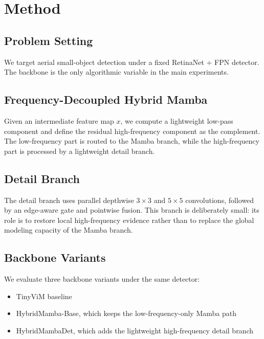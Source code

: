 \section{Method}

\subsection{Problem Setting}

We target aerial small-object detection under a fixed RetinaNet + FPN detector. The backbone is the only algorithmic variable in the main experiments.

\subsection{Frequency-Decoupled Hybrid Mamba}

Given an intermediate feature map $x$, we compute a lightweight low-pass component and define the residual high-frequency component as the complement. The low-frequency part is routed to the Mamba branch, while the high-frequency part is processed by a lightweight detail branch.

\subsection{Detail Branch}

The detail branch uses parallel depthwise $3 \times 3$ and $5 \times 5$ convolutions, followed by an edge-aware gate and pointwise fusion. This branch is deliberately small: its role is to restore local high-frequency evidence rather than to replace the global modeling capacity of the Mamba branch.

\subsection{Backbone Variants}

We evaluate three backbone variants under the same detector:

\begin{itemize}[leftmargin=1.5em]
  \item TinyViM baseline
  \item HybridMamba-Base, which keeps the low-frequency-only Mamba path
  \item HybridMambaDet, which adds the lightweight high-frequency detail branch
\end{itemize}

